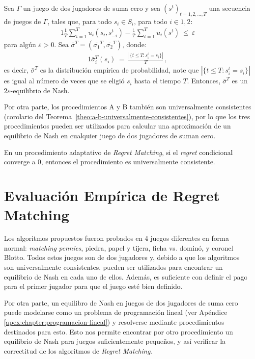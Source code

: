 \begin{theorem}
\label{theo:UC-EN}
Sea $\Gamma$ un juego de dos jugadores de suma cero y sea $(s^t)_{t=1,2,..., T}$ una secuencia de juegos de $\Gamma$, tales que, para todo $s_i \in S_i$, para todo $i \in {1, 2}$:
\begin{alignat}{1}
\frac{1}{T}\sum_{t = 1}^{T}u_i(s_i, s_{-i}^t) - \frac{1}{T} \sum_{t = 1}^T u_i(s^t)\ \leq\ \varepsilon
\end{alignat}
para algún $\varepsilon > 0$. Sea $\bar{\sigma}^T = (\bar{\sigma_1}^T, \bar{\sigma_2}^T)$, donde:
\begin{alignat}{1}
\bar{\sigma}_i^T(s_i)\ =\ \frac{|\{ t \leq T : s_i^t = s_i\}|}{T} \,,
\end{alignat}
es decir, $\bar{\sigma}^T$ es la distribución empírica de probabilidad, note que $|\{ t \leq T : s_i^t = s_i\}|$ es igual al número de veces que se eligió $s_i$ hasta el tiempo $T$. Entonces, $\bar{\sigma}^T$ es un $2\varepsilon$-equilibrio de Nash.
\end{theorem}

Por otra parte, los procedimientos A y B también son universalmente consistentes (corolario del Teorema~\ref{theo:a-b-universalmente-consistentes}), por lo que los tres procedimientos pueden ser utilizados para calcular una aproximación de un equilibrio de Nash en cualquier juego de dos jugadores de suman cero.

\begin{theorem}
\label{theo:a-b-universalmente-consistentes}
En un procedimiento adaptativo de \textit{Regret Matching}, si el \textit{regret} condicional converge a $0$, entonces el procedimiento es universalmente consistente.
\end{theorem}

\section{Evaluación Empírica de Regret Matching}

Los algoritmos propuestos fueron probados en 4 juegos diferentes en forma normal: \textit{matching pennies}, piedra, papel y tijera, ficha vs. dominó, y coronel Blotto. Todos estos juegos son de dos jugadores y, debido a que los algoritmos son universalmente consistentes, pueden ser utilizados para encontrar un equilibrio de Nash en cada uno de ellos. Además, es suficiente con definir el pago para el primer jugador para que el juego esté bien definido. 

Por otra parte, un equilibro de Nash en juegos de dos jugadores de suma cero puede modelarse como un problema de programación lineal \cite[pp.~228-233]{bib:pl-chvatal} (ver Apéndice \ref{apex:chapter:programacion-lineal}) y resolverse mediante procedimientos destinados para esto. Esto nos permite encontrar por otro procedimiento un equilibrio de Nash para juegos suficientemente pequeños, y así verificar la correctitud de los algoritmos de \emph{Regret Matching}. 

